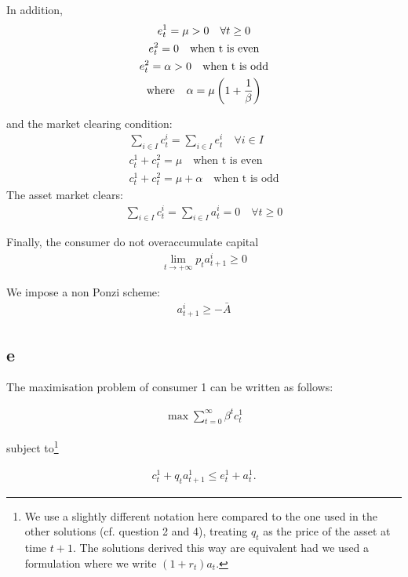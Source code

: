 \documentclass{article}
\begin{document}
In addition,
\begin{gather*}
    e_t^1=\mu>0\quad\forall t\geq 0 \\
    e_t^2=0 \quad\mbox{when t is even}\\
    e_t^2=\alpha>0\quad\mbox{when t is odd}\\
    \mbox{where \hspace{0.1in}} \alpha=\mu\left(1+\frac{1}{\beta}\right)
\end{gather*}

and the market clearing condition:
\begin{gather*}
    \sum_{i\in I}c_t^i=\sum_{i\in I}e_t^i\quad\forall i\in I \\
    c_t^1+c_t^2=\mu\quad\mbox{when t is even}\\
        c_t^1+c_t^2=\mu+\alpha\quad\mbox{when t is odd}
\end{gather*}
The asset market clears:
\begin{gather*}
    \sum_{i\in I}c_t^i=\sum_{i\in I}a_t^i=0\quad\forall t\geq 0
\end{gather*}

Finally, the consumer do not overaccumulate capital
\begin{gather*}
    \lim_{t\rightarrow +\infty} p_ta_{t+1}^i \geq 0
\end{gather*}

We impose a non Ponzi scheme:
\begin{gather*}
    a_{t+1}^i \geq - \bar{A}
\end{gather*}
\subsection{e}

The maximisation problem of consumer 1 can be written as follows:

\begin{gather*}
    \max \sum^\infty_{t=0} \beta^tc^1_t 
\end{gather*}

subject to\footnote{We use a slightly different notation here compared to the one used in the other solutions (cf. question 2 and 4), treating $q_t$ as the price of the asset at time $t+1$. The solutions derived this way are equivalent had we used a formulation where we write $(1+r_t)a_t$.}

\begin{gather*}
    c^1_t + q_ta^1_{t+1} \leq e^1_t+a^1_t.
\end{gather*}
\end{document}

